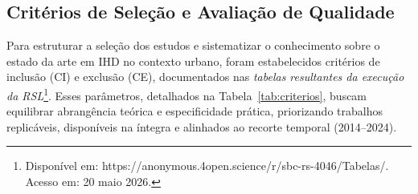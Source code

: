 \documentclass[12pt]{article}
\begin{document}

\subsection{Critérios de Seleção e Avaliação de Qualidade}

  Para estruturar a seleção dos estudos e sistematizar o conhecimento sobre o estado da arte em IHD no contexto urbano, foram estabelecidos critérios de inclusão (CI) e exclusão (CE), documentados nas \emph{tabelas resultantes da execução da RSL}\footnote{Disponível em: https://anonymous.4open.science/r/sbc-rs-4046/Tabelas/. Acesso em: 20 maio 2026.}. Esses parâmetros, detalhados na Tabela~\ref{tab:criterios}, buscam equilibrar  abrangência teórica e especificidade prática, priorizando trabalhos replicáveis, disponíveis na íntegra e alinhados ao recorte temporal (2014–2024).
\end{document}
